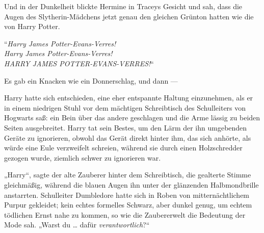 Und in der Dunkelheit blickte Hermine in Traceys Gesicht und sah, dass die Augen des Slytherin-Mädchens jetzt genau den gleichen Grünton hatten wie die von Harry Potter.

“\emph{Harry James Potter-Evans-Verres!\\
Harry James Potter-Evans-Verres!\\
HARRY JAMES POTTER-EVANS-VERRES!}“

Es gab ein Knacken wie ein Donnerschlag, und dann —

\later

Harry hatte sich entschieden, eine eher entspannte Haltung einzunehmen, als er in einem niedrigen Stuhl vor dem mächtigen Schreibtisch des Schulleiters von Hogwarts saß: ein Bein über das andere geschlagen und die Arme lässig zu beiden Seiten ausgebreitet. Harry tat sein Bestes, um den Lärm der ihn umgebenden Geräte zu ignorieren, obwohl das Gerät direkt hinter ihm, das sich anhörte, als würde eine Eule verzweifelt schreien, während sie durch einen Holzschredder gezogen wurde, ziemlich schwer zu ignorieren war.

„Harry“, sagte der alte Zauberer hinter dem Schreibtisch, die gealterte Stimme gleichmäßig, während die blauen Augen ihn unter der glänzenden Halbmondbrille anstarrten. Schulleiter Dumbledore hatte sich in Roben von mitternächtlichem Purpur gekleidet; kein echtes formelles Schwarz, aber dunkel genug, um echtem tödlichen Ernst nahe zu kommen, so wie die Zaubererwelt die Bedeutung der Mode sah.
„Warst du … dafür \emph{verantwortlich}?“

